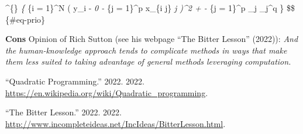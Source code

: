 \documentclass[
  ignorenonframetext,
  aspectratio=32,
]{beamer}
\newlength{\cslhangindent}
\newlength{\cslentryspacingunit} %
\newenvironment{CSLReferences}[2] %
 {%
  \setlength{\parindent}{0pt}
  \ifodd #1
  \let\oldpar\par
  \def\par{\hangindent=\cslhangindent\oldpar}
  \fi
  \setlength{\parskip}{#2\cslentryspacingunit}
 }%
 {}
\begin{document}
\begin{frame}{\hat{\beta}\^{}\{\}}
\protect\hypertarget{section}{}
\emph{\beta \left\{ \sum}\{i = 1\}\^{}N \left( y\_i -
\beta\emph{0 - \sum}\{j = 1\}\^{}p x\_\{i j\} \beta\emph{j \right)\^{}2
+ - \sum}\{j = 1\}\^{}p \lambda\_j \textbar{}\beta\_j\textbar\^{}q
\right\} \$\$ \{\#eq-prio\}

\textbf{Cons} Opinion of Rich Sutton (see his webpage {``The Bitter
Lesson''} (2022)): \emph{And the human-knowledge approach tends to
complicate methods in ways that make them less suited to taking
advantage of general methods leveraging computation.}

\hypertarget{refs}{}
\begin{CSLReferences}{1}{0}
\leavevmode{}%
{``Quadratic Programming.''} 2022. 2022.
\url{https://en.wikipedia.org/wiki/Quadratic_programming}.

\leavevmode{}%
{``The Bitter Lesson.''} 2022. 2022.
\url{http://www.incompleteideas.net/IncIdeas/BitterLesson.html}.

\end{CSLReferences}
\end{frame}
\end{document}
